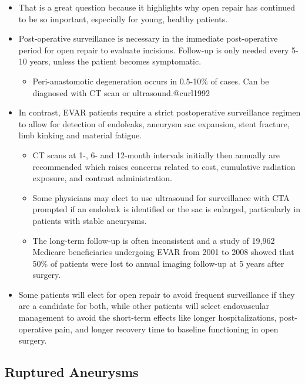 \documentclass[
]{book}
\providecommand{\tightlist}{%
  \setlength{\itemsep}{0pt}\setlength{\parskip}{0pt}}
\begin{document}
\begin{itemize}
\item
  That is a great question because it highlights why open repair has
  continued to be so important, especially for young, healthy
  patients.
\item
  Post-operative surveillance is necessary in the immediate
  post-operative period for open repair to evaluate incisions.
  Follow-up is only needed every 5-10 years, unless the patient
  becomes symptomatic.

  \begin{itemize}
  \tightlist
  \item
    Peri-anastomotic degeneration occurs in 0.5-10\% of cases. Can be
    diagnosed with CT scan or ultrasound.@curl1992
  \end{itemize}
\item
  In contrast, EVAR patients require a strict postoperative
  surveillance regimen to allow for detection of endoleaks, aneurysm
  sac expansion, stent fracture, limb kinking and material fatigue.

  \begin{itemize}
  \item
    CT scans at 1-, 6- and 12-month intervals initially then
    annually are recommended which raises concerns related to cost,
    cumulative radiation exposure, and contrast administration.
  \item
    Some physicians may elect to use ultrasound for surveillance
    with CTA prompted if an endoleak is identified or the sac is
    enlarged, particularly in patients with stable aneurysms.
  \item
    The long-term follow-up is often inconsistent and a study of
    19,962 Medicare beneficiaries undergoing EVAR from 2001 to 2008
    showed that 50\% of patients were lost to annual imaging
    follow-up at 5 years after
    surgery.\citep{schanzerFollowUpComplianceEndovascular2015}
  \end{itemize}
\item
  Some patients will elect for open repair to avoid frequent
  surveillance if they are a candidate for both, while other patients
  will select endovascular management to avoid the short-term effects
  like longer hospitalizations, post-operative pain, and longer
  recovery time to baseline functioning in open surgery.
\end{itemize}

\hypertarget{ruptured-aneurysms}{%
\subsection{Ruptured Aneurysms}\label{ruptured-aneurysms}}
\end{document}
